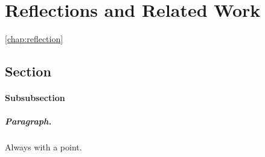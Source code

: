 \chapter{Reflections and Related Work}
\autoref{chap:reflection}
\section{Section}
\subsubsection{Subsubsection}

\paragraph{Paragraph.} Always with a point.

